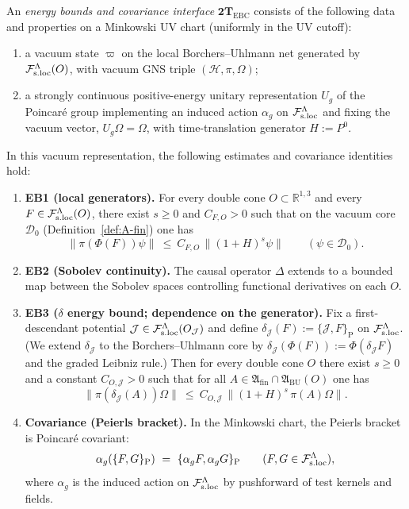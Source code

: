 \begin{definition}
\label{def:2T-EBC}
An \emph{energy bounds and covariance interface} $\mathbf{2T}_{\mathrm{EBC}}$
consists of the following data and properties on a Minkowski UV chart (uniformly
in the UV cutoff):
\begin{enumerate}[label=\textnormal{(0\roman*)},leftmargin=*,itemsep=0.4em]
\item a vacuum state $\varpi$ on the local Borchers--Uhlmann net generated by
  $\mathcal F_{\mathrm{s.loc}}^\Lambda(O)$, with vacuum GNS triple $(\mathcal H,\pi,\Omega)$;
\item a strongly continuous positive-energy unitary representation $U_g$ of the
  Poincar\'e group implementing an induced action $\alpha_g$ on $\mathcal F_{\mathrm{s.loc}}^\Lambda$ and
  fixing the vacuum vector, $U_g\Omega=\Omega$, with time-translation generator
  $H:=P^0$.
\end{enumerate}
In this vacuum representation, the following estimates and covariance identities
hold:
\begin{enumerate}[label=\textnormal{(\roman*)},leftmargin=*,itemsep=0.4em]
\item \textbf{EB1 (local generators).} For every double cone
  $O\subset\mathbb R^{1,3}$ and every $F\in\mathcal F_{\mathrm{s.loc}}^\Lambda(O)$, there exist $s\ge 0$ and
  $C_{F,O}>0$ such that on the vacuum core $\mathcal D_0$ (Definition~\ref{def:A-fin})
  one has
  \[
  \|\pi(\Phi(F))\psi\|\ \le\ C_{F,O}\,\|(1+H)^s\psi\|
  \qquad(\psi\in\mathcal D_0).
  \]
\item \textbf{EB2 (Sobolev continuity).} The causal operator $\Delta$ extends to a
  bounded map between the Sobolev spaces controlling functional derivatives on
  each $O$.
\item \textbf{EB3 ($\delta$ energy bound; dependence on the generator).}
  Fix a first-descendant potential $\mathcal J\in\mathcal F_{\mathrm{s.loc}}^\Lambda(O_{\mathcal J})$ and
  define $\delta_{\mathcal J}(F):=\{\mathcal J,F\}_{\mathrm P}$ on $\mathcal F_{\mathrm{s.loc}}^\Lambda$.
  (We extend $\delta_{\mathcal J}$ to the Borchers--Uhlmann core by
  $\delta_{\mathcal J}(\Phi(F)):=\Phi(\delta_{\mathcal J}F)$ and the graded Leibniz rule.)
  Then for every double cone $O$ there exist $s\ge 0$ and a constant
  $C_{O,\mathcal J}>0$ such that for all
  $A\in\mathfrak A_{\mathrm{fin}}\cap\mathfrak A_{\mathrm{BU}}(O)$ one has
  \[
  \|\pi(\delta_{\mathcal J}(A))\Omega\|\ \le\ C_{O,\mathcal J}\,
  \|(1+H)^s\,\pi(A)\Omega\|.
  \]
\item \textbf{Covariance (Peierls bracket).} In the Minkowski chart, the Peierls
  bracket is Poincar\'e covariant:
  \[
  \alpha_g(\{F,G\}_{\mathrm P})\ =\ \{\alpha_gF,\alpha_gG\}_{\mathrm P}
  \qquad(F,G\in\Fsloc),
  \]
  where $\alpha_g$ is the induced action on $\mathcal F_{\mathrm{s.loc}}^\Lambda$ by pushforward of test
  kernels and fields.
\end{enumerate}
\end{definition}

